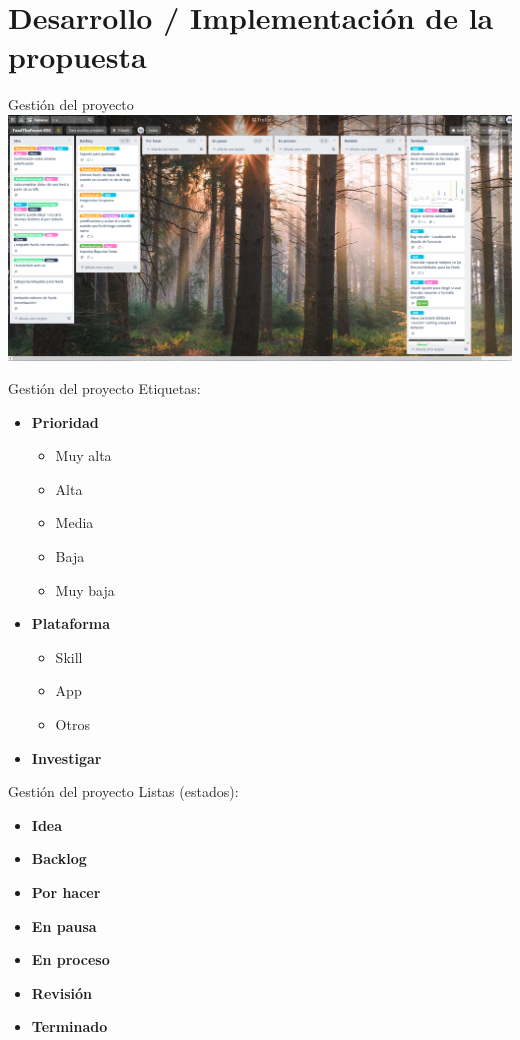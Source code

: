 \documentclass{beamer}
\begin{document}
  \section{Desarrollo / Implementación de la propuesta}
 
  \begin{frame}{Gestión del proyecto}
    \includegraphics[width=\textwidth,trim={0 0 5.3cm 0},clip]{gestion-proyecto-trello.png}
  \end{frame}

  \begin{frame}{Gestión del proyecto}
    Etiquetas:
    \begin{itemize}
      \setlength\itemsep{1.5em}
      \item \textbf{Prioridad}
      \begin{itemize}
        \item Muy alta
        \item Alta
        \item Media
        \item Baja
        \item Muy baja
      \end{itemize}
      \item \textbf{Plataforma}
      \begin{itemize}
        \item Skill
        \item App
        \item Otros
      \end{itemize}
      \item \textbf{Investigar}
    \end{itemize}
  \end{frame}

  \begin{frame}{Gestión del proyecto}
    Listas (estados):
    \begin{itemize}
      \setlength\itemsep{1em}
      \item \textbf{Idea}
      \item \textbf{Backlog}
      \item \textbf{Por hacer}
      \item \textbf{En pausa}
      \item \textbf{En proceso}
      \item \textbf{Revisión}
      \item \textbf{Terminado}
    \end{itemize}
  \end{frame}
\end{document}
